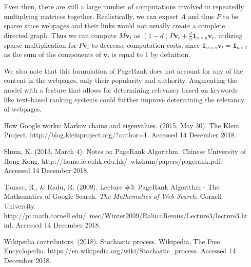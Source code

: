 \documentclass[11pt]{article}
\theoremstyle{definition}
\renewcommand{\vec}[1]{\mathbf{#1}}
\begin{document}
Even then, there are still a large number of computations involved in repeatedly multiplying matrices together.
Realistically, we can expect $A$ and thus $P$ to be sparse since webpages and their links would not usually create a complete directed graph.
Thus we can compute $M \vec{v}_t$ as $(1-d) P \vec{v}_t + \frac{d}{n} \vec{1}_{n \times n} \vec{v}_t $, utilizing sparse multiplication for $P \vec{v}_t$ to decrease computation costs,
since $\vec{1}_{n \times n} \vec{v}_t = \vec{1}_{n \times 1}$ as the sum of the components of $\vec{v}_t$ is equal to 1 by definition.

We also note that this formulation of PageRank does not account for any of the content in the webpages, only their popularity and authority. Augmenting the model with a feature that allows for determining relevancy based on keywords like text-based ranking systems could further improve determining the relevancy of webpages.

\begin{thebibliography}{9}
How Google works: Markov chains and eigenvalues. (2015, May 30). The Klein Project. http://blog.kleinproject.org/?author=1. Accessed 14 December 2018.

Shum, K. (2013, March 4). Notes on PageRank Algorithm. Chinese University of Hong Kong. http://home.ie.cuhk.edu.hk/~wkshum/papers/pagerank.pdf. Accessed 14 December 2018.

Tanase, R., \& Radu, R. (2009). Lecture \#3: PageRank Algorithm - The Mathematics of Google Search.
\textit{The Mathematics of Web Search.} Cornell University. 
http://pi.math.cornell.edu/~mec/Winter2009/RalucaRemus/Lecture3/lecture3.html. Accessed 14 December 2018.

Wikipedia contributors. (2018). Stochastic process. Wikipedia, The Free Encyclopedia. https://en.wikipedia.org/wiki/Stochastic\_process. Accessed 14 December 2018.

\end{thebibliography}
\end{document}
